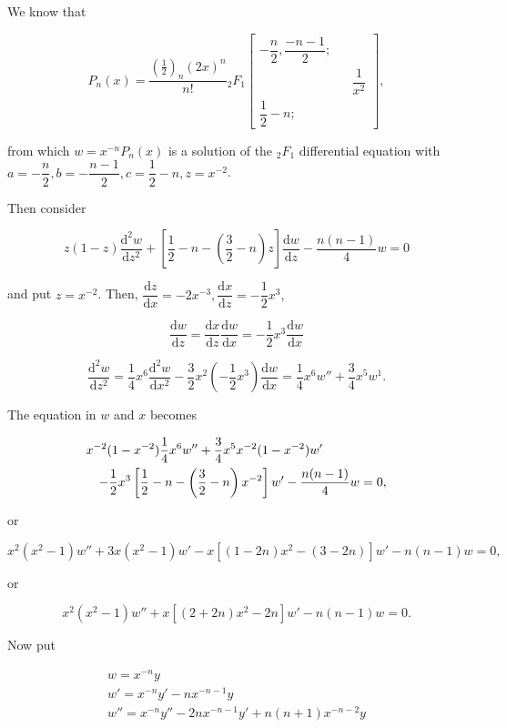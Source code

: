\begin{solution}
We know that

$$P_n(x) = \dfrac{(\frac{1}{2})_n (2x)^n}{n!} {}_2F_1 \left[ \begin{array}{rlr}
-\dfrac{n}{2}, \dfrac{-n-1}{2}; & & \\
& & \dfrac{1}{x^2} \\ 
\dfrac{1}{2}-n; & &
\end{array} \right],$$

from which $w = x^{-n}P_n(x)$ is a solution of the ${}_2F_1$ differential equation with $a = -\dfrac{n}{2}, b = - \dfrac{n-1}{2}, c = \dfrac{1}{2}-n, z = x^{-2}$. 

Then consider

$$z(1-z) \dfrac{\mathrm{d}^2w}{\mathrm{d}z^2} + \left[ \dfrac{1}{2} - n - \left( \dfrac{3}{2} - n \right)z \right] \dfrac{\mathrm{d}w}{\mathrm{d}z} - \dfrac{n(n-1)}{4}w = 0$$

and put $z = x^{-2}$. Then, $\dfrac{\mathrm{d}z}{\mathrm{d}x} = -2x^{-3}, \dfrac{\mathrm{d}x}{\mathrm{d}z} = -\dfrac{1}{2} x^3,$

$$\dfrac{\mathrm{d}w}{\mathrm{d}z} = \dfrac{\mathrm{d}x}{\mathrm{d}z} \dfrac{\mathrm{d}w}{\mathrm{d}x} = -\dfrac{1}{2} x^3 \dfrac{\mathrm{d}w}{\mathrm{d}x}$$

$$\dfrac{\mathrm{d}^2w}{\mathrm{d}z^2} = \dfrac{1}{4} x^6 \dfrac{\mathrm{d}^2w}{\mathrm{d}x^2} - \dfrac{3}{2} x^2 \left( -\dfrac{1}{2} x^3 \right) \dfrac{\mathrm{d}w}{\mathrm{d}x} = \dfrac{1}{4} x^6 w'' + \dfrac{3}{4} x^5 w^1.$$

The equation in $w$ and $x$ becomes

\begin{eqnarray*}
\lefteqn{x^{-2}(1-x^{-2}) \dfrac{1}{4} x^6 w'' + \dfrac{3}{4} x^5 x^{-2}(1-x^{-2})w'} \\
& & - \dfrac{1}{2} x^3 \left[ \dfrac{1}{2} - n - \left( \dfrac{3}{2} - n \right) x^{-2} \right]w' - \dfrac{n(n-1)}{4}w = 0,
\end{eqnarray*}

or

$$x^2 (x^2-1) w'' + 3x(x^2-1)w' - x[(1-2n)x^2 - (3-2n)]w' - n(n-1)w = 0,$$

or

$$x^2(x^2-1)w'' + x[(2+2n)x^2-2n]w' - n(n-1)w = 0.$$

Now put

$$\begin{array}{ll}
w = x^{-n}y \\
w' = x^{-n}y' -nx^{-n-1}y \\
w'' = x^{-n} y'' - 2nx^{-n-1}y' + n(n+1) x^{-n-2}y
\end{array}$$


\end{solution}
